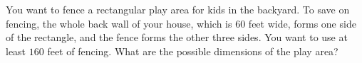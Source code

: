 You want to fence a rectangular play area for kids in the backyard. To save on fencing, the whole back wall of your house, which is $60$ feet wide, forms one side of the rectangle, and the fence forms the other three sides. You want to use at least $160$ feet of fencing. What are the possible dimensions of the play area?
